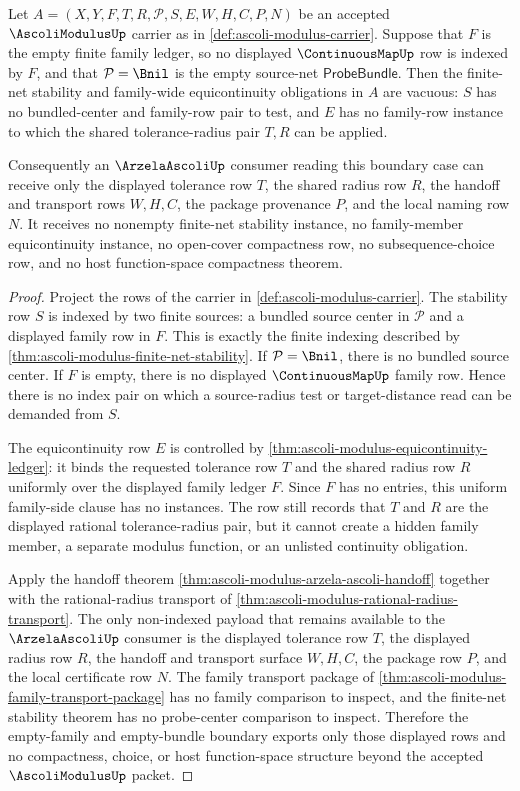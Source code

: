 \begin{theorem}
\label{thm:ascoli-modulus-empty-family-vacuity}
Let $A=(X,Y,F,T,R,\mathcal{P},S,E,W,H,C,P,N)$ be an accepted $\AscoliModulusUp$ carrier as in \autoref{def:ascoli-modulus-carrier}. Suppose that $F$ is the empty finite family ledger, so no displayed $\ContinuousMapUp$ row is indexed by $F$, and that $\mathcal{P}=\Bnil$ is the empty source-net $\mathsf{ProbeBundle}$. Then the finite-net stability and family-wide equicontinuity obligations in $A$ are vacuous: $S$ has no bundled-center and family-row pair to test, and $E$ has no family-row instance to which the shared tolerance-radius pair $T,R$ can be applied.

Consequently an $\ArzelaAscoliUp$ consumer reading this boundary case can receive only the displayed tolerance row $T$, the shared radius row $R$, the handoff and transport rows $W,H,C$, the package provenance $P$, and the local naming row $N$. It receives no nonempty finite-net stability instance, no family-member equicontinuity instance, no open-cover compactness row, no subsequence-choice row, and no host function-space compactness theorem.
\end{theorem}
\begin{proof}
Project the rows of the carrier in \autoref{def:ascoli-modulus-carrier}. The stability row $S$ is indexed by two finite sources: a bundled source center in $\mathcal{P}$ and a displayed family row in $F$. This is exactly the finite indexing described by \autoref{thm:ascoli-modulus-finite-net-stability}. If $\mathcal{P}=\Bnil$, there is no bundled source center. If $F$ is empty, there is no displayed $\ContinuousMapUp$ family row. Hence there is no index pair on which a source-radius test or target-distance read can be demanded from $S$.

The equicontinuity row $E$ is controlled by \autoref{thm:ascoli-modulus-equicontinuity-ledger}: it binds the requested tolerance row $T$ and the shared radius row $R$ uniformly over the displayed family ledger $F$. Since $F$ has no entries, this uniform family-side clause has no instances. The row still records that $T$ and $R$ are the displayed rational tolerance-radius pair, but it cannot create a hidden family member, a separate modulus function, or an unlisted continuity obligation.

Apply the handoff theorem \autoref{thm:ascoli-modulus-arzela-ascoli-handoff} together with the rational-radius transport of \autoref{thm:ascoli-modulus-rational-radius-transport}. The only non-indexed payload that remains available to the $\ArzelaAscoliUp$ consumer is the displayed tolerance row $T$, the displayed radius row $R$, the handoff and transport surface $W,H,C$, the package row $P$, and the local certificate row $N$. The family transport package of \autoref{thm:ascoli-modulus-family-transport-package} has no family comparison to inspect, and the finite-net stability theorem has no probe-center comparison to inspect. Therefore the empty-family and empty-bundle boundary exports only those displayed rows and no compactness, choice, or host function-space structure beyond the accepted $\AscoliModulusUp$ packet.
\end{proof}

